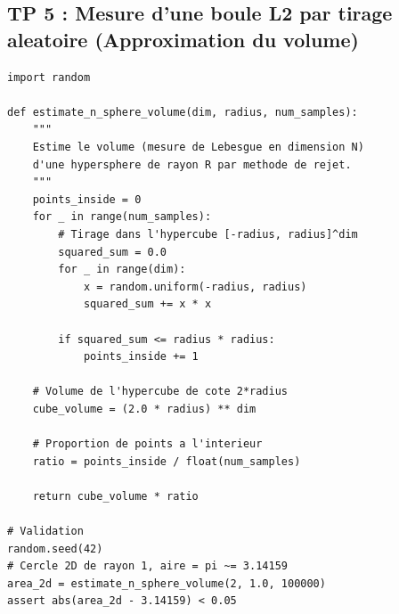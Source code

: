 \documentclass[11pt,a4paper]{article}
\begin{document}
\newpage
\subsection*{TP 5 : Mesure d'une boule L2 par tirage aleatoire (Approximation du volume)}

\begin{lstlisting}
import random

def estimate_n_sphere_volume(dim, radius, num_samples):
    """
    Estime le volume (mesure de Lebesgue en dimension N)
    d'une hypersphere de rayon R par methode de rejet.
    """
    points_inside = 0
    for _ in range(num_samples):
        # Tirage dans l'hypercube [-radius, radius]^dim
        squared_sum = 0.0
        for _ in range(dim):
            x = random.uniform(-radius, radius)
            squared_sum += x * x

        if squared_sum <= radius * radius:
            points_inside += 1

    # Volume de l'hypercube de cote 2*radius
    cube_volume = (2.0 * radius) ** dim

    # Proportion de points a l'interieur
    ratio = points_inside / float(num_samples)

    return cube_volume * ratio

# Validation
random.seed(42)
# Cercle 2D de rayon 1, aire = pi ~= 3.14159
area_2d = estimate_n_sphere_volume(2, 1.0, 100000)
assert abs(area_2d - 3.14159) < 0.05
\end{lstlisting}

\newpage
\end{document}
